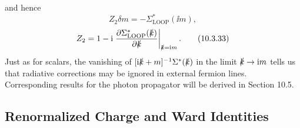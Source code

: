 and hence
\begin{equation}
Z_2\delta m=-\Sigma^*_{\mathrm{LOOP}}(\ii m),
\tag{10.3.32}\label{eq:10.3.32}
\end{equation}
\begin{equation}
Z_2=1-\mathrm{i}\left.\frac{\partial\Sigma^*_{\mathrm{LOOP}}(\slashed{k})}
{\partial\slashed{k}}\right|_{\slashed{k}=\mathrm{i} m}.
\tag{10.3.33}\label{eq:10.3.33}
\end{equation}
Just as for scalars, the vanishing of
$[\mathrm{i}\slashed{k}+m]^{-1}\Sigma^*(\slashed{k})$ in the limit $\slashed{k}\to \mathrm{i} m$ tells us that
radiative corrections may be ignored in external fermion lines. Corresponding
results for the photon propagator will be derived in Section 10.5.

\subsection{Renormalized Charge and Ward Identities}

